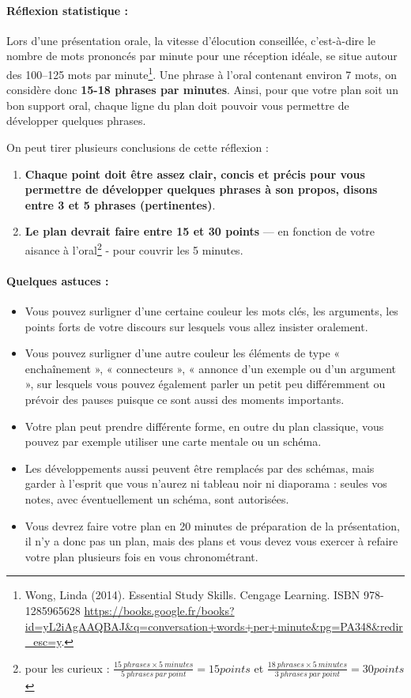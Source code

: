 \paragraph{Réflexion statistique :}
Lors d'une présentation orale, la vitesse d'élocution conseillée, c'est-à-dire le nombre de mots prononcés par minute pour une réception idéale, se situe autour des 100–125 mots par minute\footnote{Wong, Linda (2014). Essential Study Skills. Cengage Learning. ISBN 978-1285965628 \url{https://books.google.fr/books?id=yL2iAgAAQBAJ&q=conversation+words+per+minute&pg=PA348&redir_esc=y}.}.
Une phrase à l'oral contenant environ 7 mots, on considère donc \textbf{15-18 phrases par minutes}.
Ainsi, pour que votre plan soit un bon support oral, chaque ligne du plan doit pouvoir vous permettre de développer quelques phrases.

On peut tirer plusieurs conclusions de cette réflexion :
\begin{enumerate}
    \item \textbf{Chaque point doit être assez clair, concis et précis pour vous permettre de développer quelques phrases à son propos, disons entre 3 et 5 phrases (pertinentes)}.
    \item \textbf{Le plan devrait faire entre 15 et 30 points} — en fonction de votre aisance à l'oral\footnote{pour les curieux : $ \frac{15\ phrases \times 5\ minutes}{5\ phrases\ par\ point} = 15 points$ et $ \frac{18\ phrases \times 5\ minutes}{3\ phrases\ par\ point} = 30 points$} - pour couvrir les 5 minutes.
\end{enumerate}

\paragraph{Quelques astuces :}
\begin{itemize}
    \item Vous pouvez surligner d’une certaine couleur les mots clés, les arguments, les points forts de votre discours sur lesquels vous allez insister oralement.
    \item Vous pouvez surligner d’une autre couleur les éléments de type « enchaînement », « connecteurs », « annonce d'un exemple ou d’un argument », sur lesquels vous pouvez également parler un petit peu différemment ou prévoir des pauses puisque ce sont aussi des moments importants.
    \item Votre plan peut prendre différente forme, en outre du plan classique, vous pouvez par exemple utiliser une carte mentale ou un schéma.
    \item Les développements aussi peuvent être remplacés par des schémas, mais garder à l'esprit que vous n'aurez ni tableau noir ni diaporama : seules vos notes, avec éventuellement un schéma, sont autorisées.
    \item Vous devrez faire votre plan en 20 minutes de préparation de la présentation, il n'y a donc pas un plan, mais des plans et vous devez vous exercer à refaire votre plan plusieurs fois en vous chronométrant. 
\end{itemize}
\newpage

